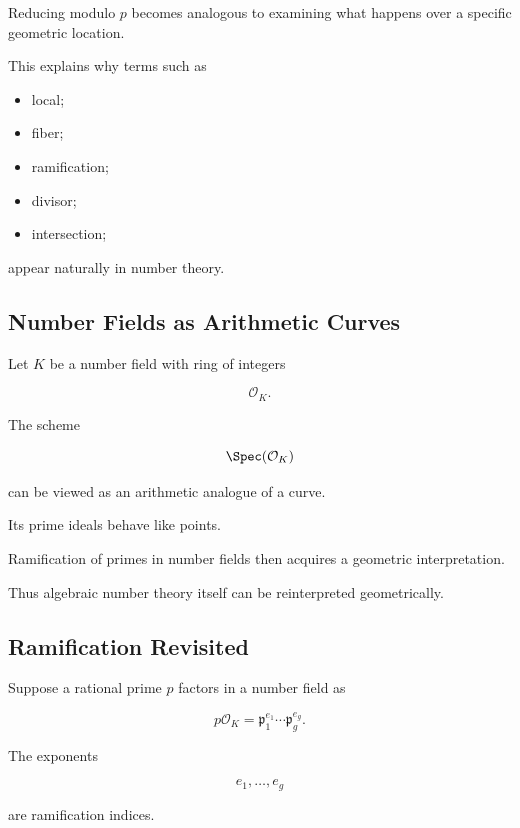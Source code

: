 Reducing modulo \(p\) becomes analogous to examining what happens over a
specific geometric location.

This explains why terms such as

\begin{itemize}
    \item local;
    \item fiber;
    \item ramification;
    \item divisor;
    \item intersection;
\end{itemize}

appear naturally in number theory.

\subsection{Number Fields as Arithmetic Curves}
\label{subsec:number-fields-arithmetic-curves}

Let \(K\) be a number field with ring of integers

\[ \mathcal O_K. \]

The scheme

\[ \Spec(\mathcal O_K) \]

can be viewed as an arithmetic analogue of a curve.

Its prime ideals behave like points.

Ramification of primes in number fields then acquires a geometric
interpretation.

Thus algebraic number theory itself can be reinterpreted geometrically.

\subsection{Ramification Revisited}
\label{subsec:ramification-arithmetic-geometry}

Suppose a rational prime \(p\) factors in a number field as

\[ p\mathcal O_K=\mathfrak p_1^{e_1}\cdots\mathfrak p_g^{e_g}. \]

The exponents

\[ e_1,\ldots,e_g \]

are ramification indices.


